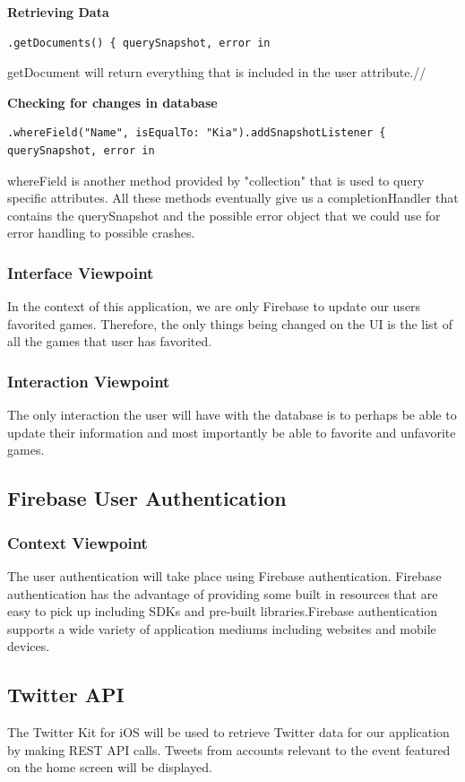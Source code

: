 \documentclass[onecolumn, draftclsnofoot,10pt, compsoc]{IEEEtran}
\begin{document}
\noindent\textbf{Retrieving Data}
\begin{lstlisting}
.getDocuments() { querySnapshot, error in 
\end{lstlisting}
getDocument will return everything that is included in the user attribute.// 

\noindent\textbf{Checking for changes in database}
\begin{lstlisting}
.whereField("Name", isEqualTo: "Kia").addSnapshotListener { querySnapshot, error in 
\end{lstlisting}

\noindent whereField is another method provided by "collection" that is used to query specific attributes. All these methods eventually give us a completionHandler that contains the querySnapshot and the possible error object that we could use for error handling to possible crashes.
\subsubsection{Interface Viewpoint}
In the context of this application, we are only Firebase to update our users favorited games. Therefore, the only things being changed on the UI is the list of all the games that user has favorited. 
\subsubsection{Interaction Viewpoint}
The only interaction the user will have with the database is to perhaps be able to update their information and most importantly be able to favorite and unfavorite games.
\subsection{Firebase User Authentication}
\subsubsection{Context Viewpoint}
The user authentication will take place using Firebase authentication. Firebase authentication has the advantage of providing some built in resources that are easy to pick up including SDKs and pre-built libraries.Firebase authentication supports a wide variety of application mediums including websites and mobile devices. 

\subsection{Twitter API}
The Twitter Kit for iOS will be used to retrieve Twitter data for our application by making REST API calls\cite{twitter}. 
Tweets from accounts relevant to the event featured on the home screen will be displayed. 
\end{document}
